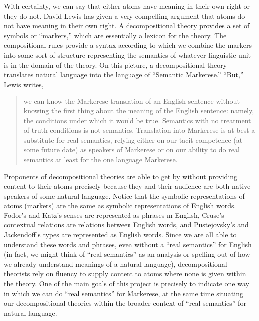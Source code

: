 \documentclass[12pt]{amsart}
\begin{document}
With certainty, we can say that either atoms have meaning in their own right or they do not. David Lewis \cite{lewis_general_1970} has given a very compelling argument that atoms do not have meaning in their own right. A decompositional theory provides a set of symbols or ``markers,'' which are essentially a lexicon for the theory. The compositional rules provide a syntax according to which we combine the markers into some sort of structure representing the semantics of whatever linguistic unit is in the domain of the theory. On this picture, a decompositional theory translates natural language into the language of ``Semantic Markerese.'' ``But,'' Lewis writes,
\begin{quote}
we can know the Markerese translation of an English sentence without knowing the first thing about the meaning of the English sentence: namely, the conditions under which it would be true. Semantics with no treatment of truth conditions is not semantics. Translation into Markerese is at best a substitute for real semantics, relying either on our tacit competence (at some future date) as speakers of Markerese or on our ability to do real semantics at least for the one language Markerese.
\end{quote}
Proponents of decompositional theories are able to get by without providing content to their atoms precisely because they and their audience are both native speakers of some natural language. Notice that the symbolic representations of atoms (markers) are the same as symbolic representations of English words. Fodor's and Katz's senses are represented as phrases in English, Cruse's contextual relations are relations between English words, and Pustejovsky's and Jackendoff's types are represented as English words. Since we are all able to understand these words and phrases, even without a ``real semantics'' for English (in fact, we might think of ``real semantics'' as an analysis or spelling-out of how we already understand meanings of a natural language), decompositional theorists rely on fluency to supply content to atoms where none is given within the theory. One of the main goals of this project is precisely to indicate one way in which we can do ``real semantics'' for Markerese, at the same time situating our decompositional theories within the broader context of ``real semantics'' for natural language.
\end{document}
